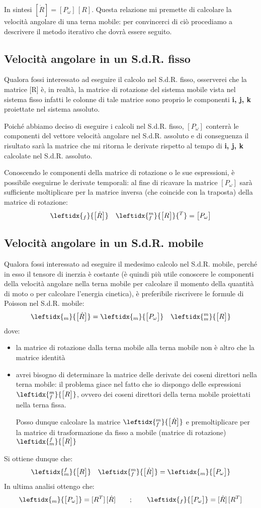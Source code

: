In sintesi $[\dot{R}] = [P_{\omega}]\,[R]$. Questa relazione mi premette di calcolare la velocità angolare di una terna mobile: per convincerci di ciò procediamo a descrivere il metodo iterativo che dovrà essere seguito.\newline

\subsection{Velocità angolare in un S.d.R. fisso}
Qualora fossi interessato ad eseguire il calcolo nel S.d.R. fisso, osserverei che la matrice [R] è, in realtà, la matrice di rotazione del sistema mobile vista nel sistema fisso infatti le colonne di tale matrice sono proprio le componenti \textbf{i, j, k} proiettate nel sistema assoluto.

 Poiché abbiamo deciso di eseguire i calcoli nel S.d.R. fisso, $[P_{\omega}]$ conterrà le componenti del vettore velocità angolare nel S.d.R. assoluto e di conseguenza il risultato sarà la matrice che mi ritorna le derivate rispetto al tempo di \textbf{i, j, k} calcolate nel S.d.R. assoluto.
 
Conoscendo le componenti della matrice di rotazione o le sue espressioni, è possibile eseguirne le derivate temporali: al fine di ricavare la matrice $[P_{\omega}]$ sarà sufficiente moltiplicare per la matrice inversa (che coincide con la traposta) della matrice di rotazione:
 \[\leftidx{_f}{\M{\dot{R}}}\quad\leftidx{_f^m}{\M{R}}{^T} = \M{P_{\omega}}\]
 
 \subsection{Velocità angolare in un S.d.R. mobile}
 Qualora fossi interessato ad eseguire il medesimo calcolo nel S.d.R. mobile, perché in esso il tensore di inerzia è costante (è quindi più utile conoscere le componenti della velocità angolare nella terna mobile per calcolare il momento della quantità di moto o per calcolare l'energia cinetica), è preferibile riscrivere le formule di Poisson nel S.d.R. mobile:
\[\leftidx{_m}{\M{\dot{R}}} = \leftidx{_m}{\M{P_{\omega}}}\quad\leftidx{_m^m}{\M{R}}\]
dove:
\begin{itemize}
\item la matrice di rotazione dalla terna mobile alla terna mobile non è altro che la matrice identità
\item avrei bisogno di determinare la matrice delle derivate dei coseni direttori nella terna mobile: il problema giace nel fatto che io dispongo delle espressioni $\leftidx{_f^m}{\M{R}}$, ovvero dei coseni direttori della terna mobile proiettati nella terna fissa.

Posso dunque calcolare la matrice $\leftidx{_f^m}{\M{\dot{R}}}$ e premoltiplicare per la matrice di trasformazione da fisso a mobile (matrice di rotazione) $\leftidx{_m^f}{\M{R}}$
\end{itemize}
Si ottiene dunque che:
\[\leftidx{_m^f}{\M{R}}\quad\leftidx{_f^m}{\M{\dot{R}}} = \leftidx{_m}{\M{P_{\omega}}}\]
In ultima analisi ottengo che:
\[\leftidx{_m}{\M{P_{\omega}}} = [R^T]\,[\dot{R}]\qquad;\qquad \leftidx{_f}{\M{P_{\omega}}} = [\dot{R}]\,[R^T]\]

